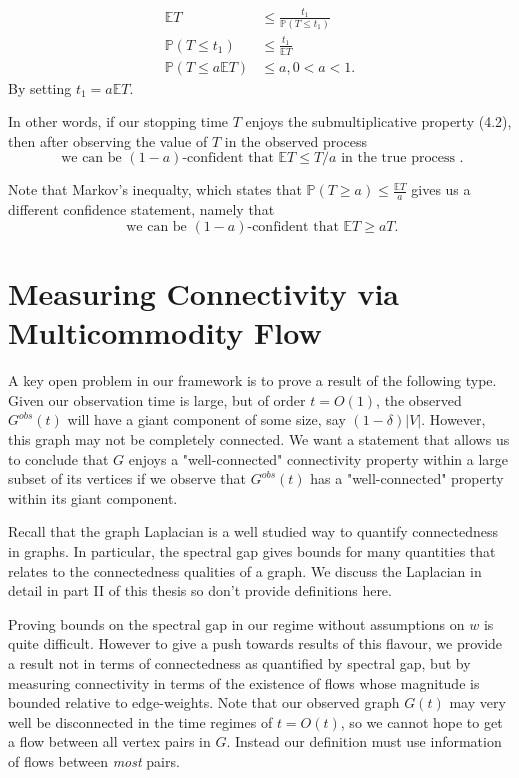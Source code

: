 \begin{equation}
\begin{split}
\mathbb{E}T &\leq \frac{t_1}{\mathbb{P}(T \leq t_1)}\\
\mathbb{P}(T \leq t_1) &\leq \frac{t_1}{\mathbb{E}T}\\
\mathbb{P}(T \leq a \mathbb{E}T) &\leq a, 0 <a <1.
\end{split}
\end{equation}
By setting $t_1 = a \mathbb{E}T$.

In other words, if our stopping time $T$ enjoys the submultiplicative property (4.2), then after observing the value of $T$ in the observed process 
\begin{equation}
\text{ we can be } (1-a) \text{-confident that } \mathbb{E}T \leq T/a \text{ in the true process }. 
\end{equation}

Note that Markov's inequalty, which states that $\mathbb{P}(T \geq a) \leq \frac{\mathbb{E}T}{a}$ gives us a different confidence statement, namely that $$ \text{ we can be } (1-a) \text{-confident that } \mathbb{E}T \geq aT.$$

\section{Measuring Connectivity via Multicommodity Flow}

A key open problem in our framework is to prove a result of the following type.  Given our observation time is large, but of order $t = O(1)$, the observed $G^{obs}(t)$ will have a giant component of some size, say $(1-\delta)|V|$.  However, this graph may not be completely connected.  We want a statement that allows us to conclude that $G$ enjoys a "well-connected" connectivity property within a large subset of its vertices if we observe that $G^{obs}(t)$ has a "well-connected" property within its giant component.  

Recall that the graph Laplacian is a well studied way to quantify connectedness in graphs.  In particular, the spectral gap gives bounds for many quantities that relates to the connectedness qualities of a graph.  We discuss the Laplacian in detail in part II of this thesis so don't provide definitions here.  

Proving bounds on the spectral gap in our regime without assumptions on $w$ is quite difficult.  However to give a push towards results of this flavour, we provide a result not in terms of connectedness as quantified by spectral gap, but by measuring connectivity in terms of the existence of flows whose magnitude is bounded relative to edge-weights.  Note that our observed graph $G(t)$ may very well be disconnected in the time regimes of $t=O(t)$, so we cannot hope to get a flow between all vertex pairs in $G$.  Instead our definition must use information of flows between \textit{most} pairs. 


